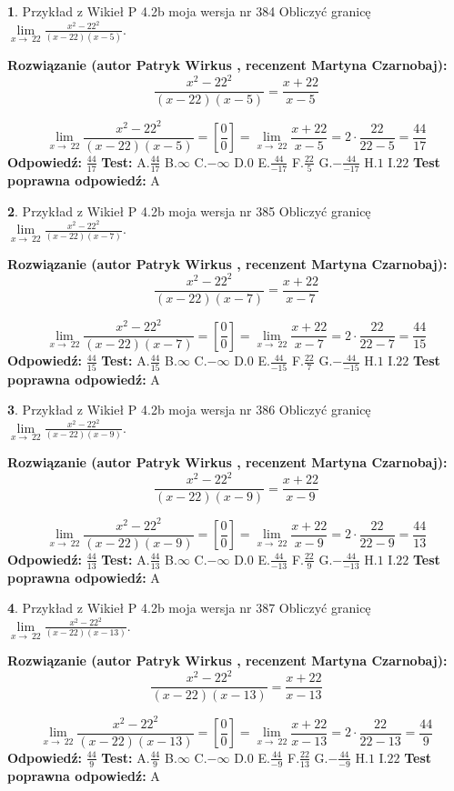 \documentclass[12pt, a4paper]{article}
\theoremstyle{definition} %
\newtheorem{zad}{}
\newcommand{\zadStart}[1]{\begin{zad}#1\newline}
\newcommand{\zadStop}{\end{zad}}
\newcommand{\rozwStart}[2]{\noindent \textbf{Rozwiązanie (autor #1 , recenzent #2): }\newline}
\newcommand{\rozwStop}{\newline}
\newcommand{\odpStart}{\noindent \textbf{Odpowiedź:}\newline}
\newcommand{\odpStop}{\newline}
\newcommand{\testStart}{\noindent \textbf{Test:}\newline}
\newcommand{\testStop}{\newline}
\newcommand{\kluczStart}{\noindent \textbf{Test poprawna odpowiedź:}\newline}
\newcommand{\kluczStop}{\newline}
\begin{document}
\zadStart{Przykład z Wikieł P 4.2b moja wersja nr 384}
Obliczyć granicę $\lim\limits_{x\to\ 22}\frac{x^{2}-22^{2}}{(x-22)(x-5)}$.
\zadStop
\rozwStart{Patryk Wirkus}{Martyna Czarnobaj}
$$\frac{x^{2}-22^{2}}{(x-22)(x-5)}=\frac{x+22}{x-5}$$

$$\lim\limits_{x\to\ 22}\frac{x^{2}-22^{2}}{(x-22)(x-5)}=[\frac{0}{0}]=\lim\limits_{x\to\ 22}\frac{x+22}{x-5}=2 \cdot \frac{22}{22-5} = \frac{44}{17}$$
\rozwStop
\odpStart
$\frac{44}{17}$
\odpStop
\testStart
A.$\frac{44}{17}$
B.$\infty$
C.$-\infty$
D.$0$
E.$\frac{44}{-17}$
F.$\frac{22}{5}$
G.$-\frac{44}{-17}$
H.$1$
I.$22$
\testStop
\kluczStart
A
\kluczStop



\zadStart{Przykład z Wikieł P 4.2b moja wersja nr 385}
Obliczyć granicę $\lim\limits_{x\to\ 22}\frac{x^{2}-22^{2}}{(x-22)(x-7)}$.
\zadStop
\rozwStart{Patryk Wirkus}{Martyna Czarnobaj}
$$\frac{x^{2}-22^{2}}{(x-22)(x-7)}=\frac{x+22}{x-7}$$

$$\lim\limits_{x\to\ 22}\frac{x^{2}-22^{2}}{(x-22)(x-7)}=[\frac{0}{0}]=\lim\limits_{x\to\ 22}\frac{x+22}{x-7}=2 \cdot \frac{22}{22-7} = \frac{44}{15}$$
\rozwStop
\odpStart
$\frac{44}{15}$
\odpStop
\testStart
A.$\frac{44}{15}$
B.$\infty$
C.$-\infty$
D.$0$
E.$\frac{44}{-15}$
F.$\frac{22}{7}$
G.$-\frac{44}{-15}$
H.$1$
I.$22$
\testStop
\kluczStart
A
\kluczStop



\zadStart{Przykład z Wikieł P 4.2b moja wersja nr 386}
Obliczyć granicę $\lim\limits_{x\to\ 22}\frac{x^{2}-22^{2}}{(x-22)(x-9)}$.
\zadStop
\rozwStart{Patryk Wirkus}{Martyna Czarnobaj}
$$\frac{x^{2}-22^{2}}{(x-22)(x-9)}=\frac{x+22}{x-9}$$

$$\lim\limits_{x\to\ 22}\frac{x^{2}-22^{2}}{(x-22)(x-9)}=[\frac{0}{0}]=\lim\limits_{x\to\ 22}\frac{x+22}{x-9}=2 \cdot \frac{22}{22-9} = \frac{44}{13}$$
\rozwStop
\odpStart
$\frac{44}{13}$
\odpStop
\testStart
A.$\frac{44}{13}$
B.$\infty$
C.$-\infty$
D.$0$
E.$\frac{44}{-13}$
F.$\frac{22}{9}$
G.$-\frac{44}{-13}$
H.$1$
I.$22$
\testStop
\kluczStart
A
\kluczStop



\zadStart{Przykład z Wikieł P 4.2b moja wersja nr 387}
Obliczyć granicę $\lim\limits_{x\to\ 22}\frac{x^{2}-22^{2}}{(x-22)(x-13)}$.
\zadStop
\rozwStart{Patryk Wirkus}{Martyna Czarnobaj}
$$\frac{x^{2}-22^{2}}{(x-22)(x-13)}=\frac{x+22}{x-13}$$

$$\lim\limits_{x\to\ 22}\frac{x^{2}-22^{2}}{(x-22)(x-13)}=[\frac{0}{0}]=\lim\limits_{x\to\ 22}\frac{x+22}{x-13}=2 \cdot \frac{22}{22-13} = \frac{44}{9}$$
\rozwStop
\odpStart
$\frac{44}{9}$
\odpStop
\testStart
A.$\frac{44}{9}$
B.$\infty$
C.$-\infty$
D.$0$
E.$\frac{44}{-9}$
F.$\frac{22}{13}$
G.$-\frac{44}{-9}$
H.$1$
I.$22$
\testStop
\kluczStart
A
\kluczStop
\end{document}
